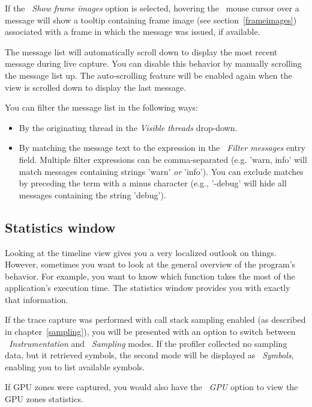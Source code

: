 \documentclass[hidelinks,titlepage,a4paper]{article}
\begin{document}
If the \emph{\faImage{}~Show frame images} option is selected, hovering the \faMousePointer{}~mouse cursor over a message will show a tooltip containing frame image (see section~\ref{frameimages}) associated with a frame in which the message was issued, if available.

The message list will automatically scroll down to display the most recent message during live capture. You can disable this behavior by manually scrolling the message list up. The auto-scrolling feature will be enabled again when the view is scrolled down to display the last message.

You can filter the message list in the following ways:

\begin{itemize}
\item By the originating thread in the \emph{\faRandom{} Visible threads} drop-down.
\item By matching the message text to the expression in the \emph{\faFilter{}~Filter messages} entry field. Multiple filter expressions can be comma-separated (e.g. 'warn, info' will match messages containing strings 'warn' \emph{or} 'info'). You can exclude matches by preceding the term with a minus character (e.g., '-debug' will hide all messages containing the string 'debug').
\end{itemize}

\subsection{Statistics window}
\label{statistics}

Looking at the timeline view gives you a very localized outlook on things. However, sometimes you want to look at the general overview of the program's behavior. For example, you want to know which function takes the most of the application's execution time. The statistics window provides you with exactly that information.

If the trace capture was performed with call stack sampling enabled (as described in chapter~\ref{sampling}), you will be presented with an option to switch between \emph{\faSyringe{}~Instrumentation} and \emph{\faEyeDropper{}~Sampling} modes. If the profiler collected no sampling data, but it retrieved symbols, the second mode will be displayed as \emph{\faPuzzlePiece{}~Symbols}, enabling you to list available symbols.

If GPU zones were captured, you would also have the \emph{\faEye{}~GPU} option to view the GPU zones statistics.
\end{document}

